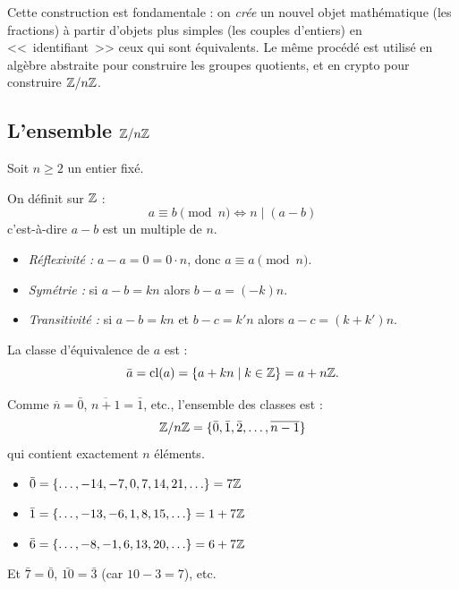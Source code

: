 \begin{intuitionbox}
Cette construction est fondamentale : on \emph{crée} un nouvel objet mathématique (les fractions) à partir d'objets plus simples (les couples d'entiers) en <<~identifiant~>> ceux qui sont équivalents. Le même procédé est utilisé en algèbre abstraite pour construire les groupes quotients, et en crypto pour construire $\mathbb{Z}/n\mathbb{Z}$.
\end{intuitionbox}


\subsection{L'ensemble $\mathbb{Z}/n\mathbb{Z}$}

Soit $n \geqslant 2$ un entier fixé.

\begin{defbox}
On définit sur $\mathbb{Z}$ :
\[a \equiv b \pmod{n} \iff n \mid (a - b)\]
c'est-à-dire $a - b$ est un multiple de $n$.
\end{defbox}

\begin{propbox}
\begin{itemize}[leftmargin=1cm]
  \item \emph{Réflexivité :} $a - a = 0 = 0 \cdot n$, donc $a \equiv a \pmod{n}$.
  \item \emph{Symétrie :} si $a - b = kn$ alors $b - a = (-k)n$.
  \item \emph{Transitivité :} si $a - b = kn$ et $b - c = k'n$ alors $a - c = (k + k')n$.
\end{itemize}
\end{propbox}

La classe d'équivalence de $a$ est :
\[\bar{a} = \mathrm{cl}(a) = \{a + kn \mid k \in \mathbb{Z}\} = a + n\mathbb{Z}.\]

Comme $\overline{n} = \bar{0}$, $\overline{n+1} = \bar{1}$, etc., l'ensemble des classes est :
\[\mathbb{Z}/n\mathbb{Z} = \{\bar{0}, \bar{1}, \bar{2}, \ldots, \overline{n-1}\}\]
qui contient exactement $n$ éléments.

\begin{exbox}[$\Z/7\Z$]
\begin{itemize}[leftmargin=1cm]
  \item $\bar{0} = \{\ldots, -14, -7, 0, 7, 14, 21, \ldots\} = 7\mathbb{Z}$
  \item $\bar{1} = \{\ldots, -13, -6, 1, 8, 15, \ldots\} = 1 + 7\mathbb{Z}$
  \item $\bar{6} = \{\ldots, -8, -1, 6, 13, 20, \ldots\} = 6 + 7\mathbb{Z}$
\end{itemize}
Et $\bar{7} = \bar{0}$, $\bar{10} = \bar{3}$ (car $10 - 3 = 7$), etc.
\end{exbox}

